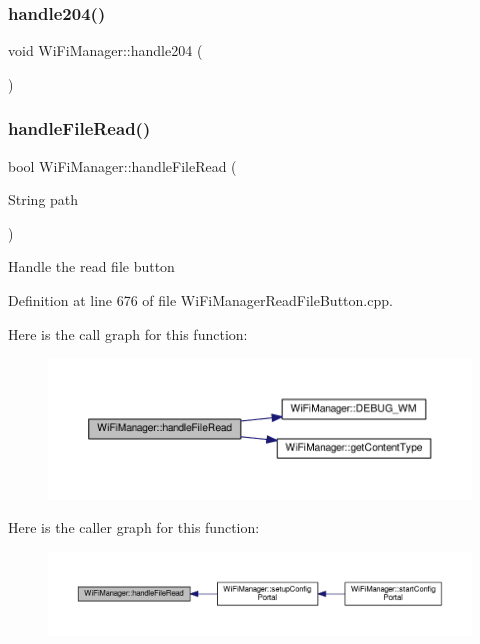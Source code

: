 \subsubsection{\texorpdfstring{handle204()}{handle204()}}
{\footnotesize\ttfamily void Wi\+Fi\+Manager\+::handle204 (\begin{DoxyParamCaption}{ }\end{DoxyParamCaption})\hspace{0.3cm}{\ttfamily [private]}}

\mbox{\label{class_wi_fi_manager_a9e802fa4ca834a622f058a7176f47806}} 
\subsubsection{\texorpdfstring{handle\+File\+Read()}{handleFileRead()}}
{\footnotesize\ttfamily bool Wi\+Fi\+Manager\+::handle\+File\+Read (\begin{DoxyParamCaption}\item[{String}]{path }\end{DoxyParamCaption})\hspace{0.3cm}{\ttfamily [private]}}

Handle the read file button 

Definition at line 676 of file Wi\+Fi\+Manager\+Read\+File\+Button.\+cpp.

Here is the call graph for this function\+:\nopagebreak
\begin{figure}[H]
\begin{center}
\leavevmode
\includegraphics[width=350pt]{class_wi_fi_manager_a9e802fa4ca834a622f058a7176f47806_cgraph}
\end{center}
\end{figure}
Here is the caller graph for this function\+:\nopagebreak
\begin{figure}[H]
\begin{center}
\leavevmode
\includegraphics[width=350pt]{class_wi_fi_manager_a9e802fa4ca834a622f058a7176f47806_icgraph}
\end{center}
\end{figure}
\mbox{\label{class_wi_fi_manager_ac35e46661f8a209d84bba62d9aa43a35}} 
